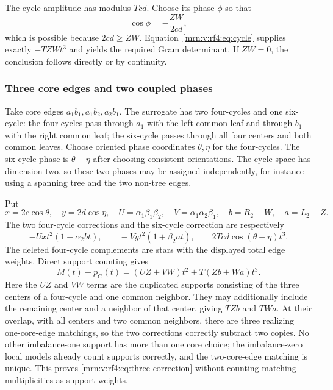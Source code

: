 \documentclass[11pt,a4paper]{article}
\theoremstyle{remark}\newtheorem{remark}[theorem]{Remark}
\begin{document}
The cycle amplitude has modulus $Tcd$. Choose its phase $\phi$ so that
\[
\cos\phi=-\frac{ZW}{2cd},
\]
which is possible because $2cd\ge ZW$. Equation~\eqref{mrn:v:rf4:eq:cycle} supplies exactly $-TZWt^3$ and yields the required Gram determinant. If $ZW=0$, the conclusion follows directly or by continuity.

\subsubsection{Three core edges and two coupled phases}
Take core edges $a_1b_1,a_1b_2,a_2b_1$. The surrogate has two four-cycles and one six-cycle: the four-cycles pass through $a_1$ with the left common leaf and through $b_1$ with the right common leaf; the six-cycle passes through all four centers and both common leaves. Choose oriented phase coordinates $\theta,\eta$ for the four-cycles. The six-cycle phase is $\theta-\eta$ after choosing consistent orientations. The cycle space has dimension two, so these two phases may be assigned independently, for instance using a spanning tree and the two non-tree edges.

Put
\[
x=2c\cos\theta,\quad y=2d\cos\eta,\quad
U=\alpha_1\beta_1\beta_2,\quad V=\alpha_1\alpha_2\beta_1,
\quad b=R_2+W,\quad a=L_2+Z.
\]
The two four-cycle corrections and the six-cycle correction are respectively
\[
-Uxt^2(1+\alpha_2bt),\qquad
-Vyt^2(1+\beta_2at),\qquad
2Tcd\cos(\theta-\eta)t^3.
\]
The deleted four-cycle complements are stars with the displayed total edge weights. Direct support counting gives
\begin{equation}\label{mrn:v:rf4:eq:three-correction}
M(t)-p_G(t)=(UZ+VW)t^2+T(Zb+Wa)t^3.
\end{equation}
Here the $UZ$ and $VW$ terms are the duplicated supports consisting of the three centers of a four-cycle and one common neighbor. They may additionally include the remaining center and a neighbor of that center, giving $TZb$ and $TWa$. At their overlap, with all centers and two common neighbors, there are three realizing one-core-edge matchings, so the two corrections correctly subtract two copies. No other imbalance-one support has more than one core choice; the imbalance-zero local models already count supports correctly, and the two-core-edge matching is unique. This proves \eqref{mrn:v:rf4:eq:three-correction} without counting matching multiplicities as support weights.
\end{document}
